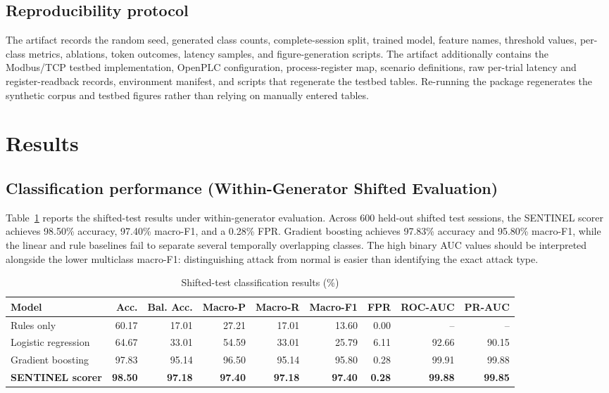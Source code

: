 \documentclass[journal]{IEEEtran}
\renewcommand{\arraystretch}{1.08}
\begin{document}
\subsection{Reproducibility protocol}
The artifact records the random seed, generated class counts, complete-session split, trained model, feature names, threshold values, per-class metrics, ablations, token outcomes, latency samples, and figure-generation scripts. The artifact additionally contains the Modbus/TCP testbed implementation, OpenPLC configuration, process-register map, scenario definitions, raw per-trial latency and register-readback records, environment manifest, and scripts that regenerate the testbed tables. Re-running the package regenerates the synthetic corpus and testbed figures rather than relying on manually entered tables.

\section{Results}
\subsection{Classification performance (Within-Generator Shifted Evaluation)}
Table~\ref{tab:mainresults} reports the shifted-test results under within-generator evaluation. Across 600 held-out shifted test sessions, the SENTINEL scorer achieves 98.50\% accuracy, 97.40\% macro-F1, and a 0.28\% FPR. Gradient boosting achieves 97.83\% accuracy and 95.80\% macro-F1, while the linear and rule baselines fail to separate several temporally overlapping classes. The high binary AUC values should be interpreted alongside the lower multiclass macro-F1: distinguishing attack from normal is easier than identifying the exact attack type.

\begin{table}[t]
\centering
\caption{Shifted-test classification results (\%)}
\label{tab:mainresults}
\renewcommand{\arraystretch}{1.15}
\begin{tabularx}{\textwidth}{@{}Xrrrrrrrr@{}}
\toprule
\textbf{Model} & \textbf{Acc.} & \textbf{Bal. Acc.} & \textbf{Macro-P} & \textbf{Macro-R} & \textbf{Macro-F1} & \textbf{FPR} & \textbf{ROC-AUC} & \textbf{PR-AUC} \\
\midrule
Rules only & 60.17 & 17.01 & 27.21 & 17.01 & 13.60 & 0.00 & -- & -- \\
Logistic regression & 64.67 & 33.01 & 54.59 & 33.01 & 25.79 & 6.11 & 92.66 & 90.15 \\
Gradient boosting & 97.83 & 95.14 & 96.50 & 95.14 & 95.80 & 0.28 & 99.91 & 99.88 \\
\textbf{SENTINEL scorer} & \textbf{98.50} & \textbf{97.18} & \textbf{97.40} & \textbf{97.18} & \textbf{97.40} & \textbf{0.28} & \textbf{99.88} & \textbf{99.85} \\
\bottomrule
\end{tabularx}
\end{table}
\end{document}
